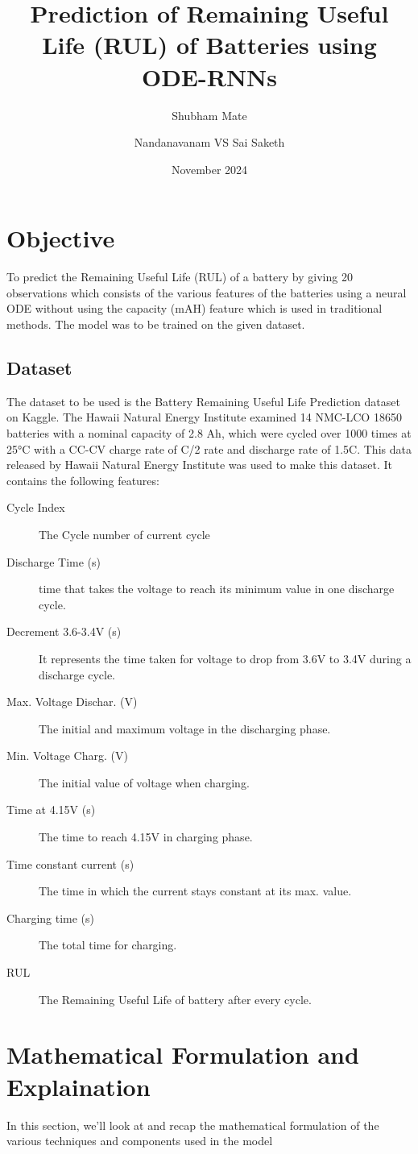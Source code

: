 \documentclass[12pt]{article}
\title{\textbf{Prediction of Remaining Useful Life (RUL) of Batteries using ODE-RNNs}}
\author{Shubham Mate}
\author{Nandanavanam VS Sai Saketh}
\affil{Department of Mathematical Science, IIT (BHU), Varanasi}
\affil{\texttt{mate.shubhamvijay.mat23@itbhu.ac.in, nvssai.saketh.mat23@itbhu.ac.in}}
\date{November 2024}
\begin{document}
	
	\maketitle
	\section{Objective}
		
		\small{To predict the Remaining Useful Life (RUL) of a battery by giving 20 observations which consists of the various features of the batteries using a neural ODE without using the capacity (mAH) feature which is used in traditional methods. The model was to be trained on the given dataset.}
		\subsection{Dataset}
			\small{The dataset to be used is the Battery Remaining Useful Life Prediction dataset on Kaggle. The Hawaii Natural Energy Institute examined 14 NMC-LCO 18650 batteries with a nominal capacity of 2.8 Ah, which were cycled over 1000 times at 25°C with a CC-CV charge rate of C/2 rate and discharge rate of 1.5C. This data released by Hawaii Natural Energy Institute was used to make this dataset. It contains the following features:
			\begin{description}
				\item[Cycle Index] The Cycle number of current cycle
				\item[Discharge Time (s)] time that takes the voltage to reach its minimum value in one discharge cycle.
				\item[Decrement 3.6-3.4V (s)] It represents the time taken for voltage to drop from 3.6V to 3.4V during a discharge cycle.
				\item[Max. Voltage Dischar. (V)] The initial and maximum voltage in the discharging phase.
				\item[Min. Voltage Charg. (V)] The initial value of voltage when charging.
				\item[Time at 4.15V (s)] The time to reach 4.15V in charging phase.
				\item[Time constant current (s)] The time in which the current stays constant at its max. value.
				\item[Charging time (s)] The total time for charging.
				\item[RUL] The Remaining Useful Life of battery after every cycle.
			\end{description}}
	\section{\large{Mathematical Formulation and Explaination}}
		\small{In this section, we'll look at and recap the mathematical formulation of the various techniques and components used in the model}
\end{document}
